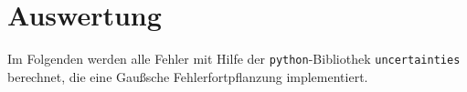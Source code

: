 \section{Auswertung}
\label{sec:auswertung}
Im Folgenden werden alle Fehler mit Hilfe der \texttt{python}-Bibliothek
\texttt{uncertainties}\cite{py-uncertainties} berechnet, die eine Gaußsche
Fehlerfortpflanzung implementiert.
